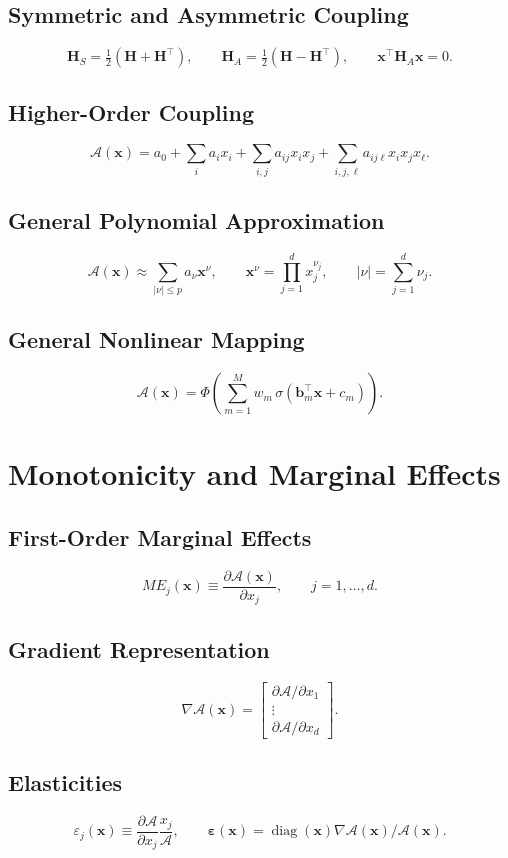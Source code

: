 \documentclass[11pt]{article}
\begin{document}
\subsection{Symmetric and Asymmetric Coupling}
\[
\bm{H}_S=\tfrac12(\bm{H}+\bm{H}^\top),
\qquad \bm{H}_A=\tfrac12(\bm{H}-\bm{H}^\top),
\qquad \bm{x}^\top\bm{H}_A\bm{x}=0.
\]

\subsection{Higher-Order Coupling}
\[
\mathcal{A}(\bm{x})=a_0+\sum_i a_i x_i+\sum_{i,j}a_{ij}x_ix_j+\sum_{i,j,\ell}a_{ij\ell}x_ix_jx_\ell.
\]

\subsection{General Polynomial Approximation}
\[
\mathcal{A}(\bm{x})\approx\sum_{|\nu|\le p} a_{\nu}\bm{x}^{\nu},
\qquad \bm{x}^{\nu}=\prod_{j=1}^d x_j^{\nu_j},
\qquad |\nu|=\sum_{j=1}^d\nu_j.
\]

\subsection{General Nonlinear Mapping}
\[
\mathcal{A}(\bm{x})=\Phi\!\left(\sum_{m=1}^M w_m\,\sigma(\bm{b}_m^\top\bm{x}+c_m)\right).
\]

\section{Monotonicity and Marginal Effects}

\subsection{First-Order Marginal Effects}
\[
ME_j(\bm{x})\equiv\frac{\partial \mathcal{A}(\bm{x})}{\partial x_j},
\qquad j=1,\dots,d.
\]

\subsection{Gradient Representation}
\[
\nabla\mathcal{A}(\bm{x})=
\begin{bmatrix}
\partial\mathcal{A}/\partial x_1\\
\vdots\\
\partial\mathcal{A}/\partial x_d
\end{bmatrix}.
\]

\subsection{Elasticities}
\[
\varepsilon_j(\bm{x})\equiv\frac{\partial\mathcal{A}}{\partial x_j}\frac{x_j}{\mathcal{A}},
\qquad \bm{\varepsilon}(\bm{x})=\operatorname{diag}(\bm{x})\nabla\mathcal{A}(\bm{x})/\mathcal{A}(\bm{x}).
\]
\end{document}
